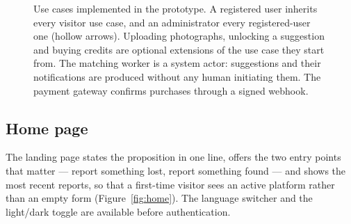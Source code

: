 \begin{figure}[htbp]
\caption{Use cases implemented in the prototype. A registered user inherits every
visitor use case, and an administrator every registered-user one (hollow
arrows). Uploading photographs, unlocking a suggestion and buying credits are
optional extensions of the use case they start from. The matching worker is a
system actor: suggestions and their notifications are produced without any human
initiating them. The payment gateway confirms purchases through a signed
webhook.}
\label{fig:usecase}
\end{figure}

\subsection{Home page}

The landing page states the proposition in one line, offers the two entry points
that matter --- report something lost, report something found --- and shows the
most recent reports, so that a first-time visitor sees an active platform rather
than an empty form (Figure~\ref{fig:home}). The language switcher and the
light/dark toggle are available before authentication.

